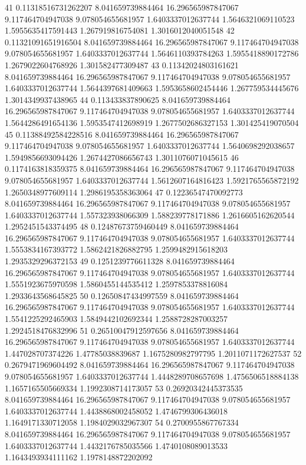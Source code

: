 {41 0.11318516731262207 8.041659739884464 16.296565987847067 9.117464704947038 9.078054655681957 1.6403337012637744 1.5646321069110523 1.5955635417591443 1.267919816754081 1.3016012040051548
42 0.11321091651916504 8.041659739884464 16.296565987847067 9.117464704947038 9.078054655681957 1.6403337012637744 1.5646110393784263 1.5955418890172786 1.2679022604768926 1.301582477309487
43 0.11342024803161621 8.041659739884464 16.296565987847067 9.117464704947038 9.078054655681957 1.6403337012637744 1.5644397681409663 1.5953658602454446 1.267759534445676 1.3014349937438965
44 0.113433837890625 8.041659739884464 16.296565987847067 9.117464704947038 9.078054655681957 1.6403337012637744 1.5644286491654136 1.5953547412698919 1.2677502686327153 1.301425419070504
45 0.11388492584228516 8.041659739884464 16.296565987847067 9.117464704947038 9.078054655681957 1.6403337012637744 1.5640698292038657 1.5949856693094426 1.2674427086656743 1.3011076071045615
46 0.1174163818359375 8.041659739884464 16.296565987847067 9.117464704947038 9.078054655681957 1.6403337012637744 1.5612607164816423 1.5921765565872192 1.2650348977609114 1.2986195358363064
47 0.12236547470092773 8.041659739884464 16.296565987847067 9.117464704947038 9.078054655681957 1.6403337012637744 1.557323938066309 1.588239778171886 1.2616605162620544 1.2952451543374495
48 0.12487673759460449 8.041659739884464 16.296565987847067 9.117464704947038 9.078054655681957 1.6403337012637744 1.5553834167393772 1.5862421826882795 1.2599482915618203 1.2935329296372153
49 0.1251239776611328 8.041659739884464 16.296565987847067 9.117464704947038 9.078054655681957 1.6403337012637744 1.5551923675970598 1.5860455144535412 1.2597853378816084 1.2933643568645825
50 0.12650847434997559 8.041659739884464 16.296565987847067 9.117464704947038 9.078054655681957 1.6403337012637744 1.5541225292465903 1.5849442102692344 1.2588728287003257 1.2924518476832996
51 0.26510047912597656 8.041659739884464 16.296565987847067 9.117464704947038 9.078054655681957 1.6403337012637744 1.447028707374226 1.47785038839687 1.1675280982797795 1.2011071172627537
52 0.2679471969604492 8.041659739884464 16.296565987847067 9.117464704947038 9.078054655681957 1.6403337012637744 1.4448289708657698 1.4756506518884138 1.1657165505669334 1.1992308714173057
53 0.26920342445373535 8.041659739884464 16.296565987847067 9.117464704947038 9.078054655681957 1.6403337012637744 1.4438868002458052 1.4746799306436018 1.1649171330712058 1.1984029032967307
54 0.2700955867767334 8.041659739884464 16.296565987847067 9.117464704947038 9.078054655681957 1.6403337012637744 1.4432176785035566 1.4740108089013533 1.1643493934111162 1.1978148872202092
}
